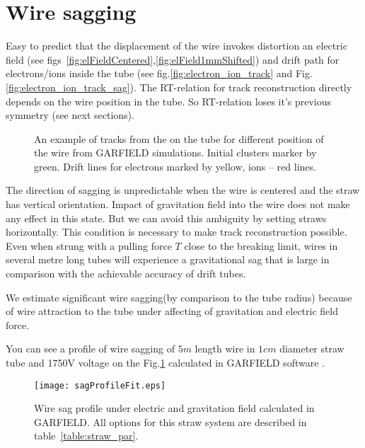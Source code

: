 \section{Wire sagging}

	Easy to predict that the displacement of the wire invokes distortion an electric field (see figs~\ref{fig:elFieldCentered},\ref{fig:elField1mmShifted}) and drift path for electrons/ions inside the tube (see fig.\ref{fig:electron_ion_track} and Fig.\ref{fig:electron_ion_track_sag}). The RT-relation for track reconstruction directly depends on the wire position in the tube. So RT-relation loses it's previous symmetry (see next sections).
	
	\begin{figure}[h!]
		\centering
		\qquad
		\caption{ An example of tracks from the on the tube for different position of the wire from GARFIELD simulations. Initial clusters marker by green. Drift lines for electrons marked by yellow, ions -- red lines.}	
	\end{figure}
	
	The direction of sagging is unpredictable when the wire is centered and the straw has vertical orientation. Impact of gravitation field into the wire does not make any effect in this state. But we can avoid this ambiguity by setting straws horizontally. This condition is necessary to make track reconstruction possible.
	Even when strung with a pulling force $T$ close to the breaking limit, wires in several metre long tubes will experience a gravitational sag that is large in comparison with the achievable accuracy of drift tubes.
	
	
	We estimate significant wire sagging(by comparison to the tube radius) because of wire attraction to the tube under affecting of gravitation and electric field force.
	
	You can see a profile of wire sagging of $5m$ length wire in $1cm$ diameter straw tube and 1750V voltage on the Fig.\ref{fig:sagProfile} calculated in GARFIELD software \cite{garfield}.
	
	\begin{figure}[h!]
	\centering
	\texttt{[image: sagProfileFit.eps]}
	\caption{Wire sag profile under electric and gravitation field calculated in GARFIELD. All options for this straw system are described in table~\ref{table:straw_par}.}
	\label{fig:sagProfile}
	\end{figure}	
	
